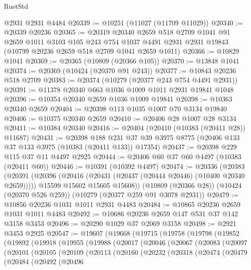 \begin{lexlean}{RustStd}
\begin{coremodule}
    @2931
    @2931
    @4484
@20339 := @10251 (@11027 (@11709 @11029))
@20340 := @20339 @20236
@20365 := @20319
    @20340
    @2659
    @518
    @2709
    @1041
    @91
    @2659
    @1011
    @3103
    @105
    @243
    @754
    @1037
    @4491
    @2931
    @2931
    @19843
    (@10799 @20236 @2659 @518 @2709 @1041 @2659 @1011)
@20366 := @10829 @1041
@20369 := @20365 (@10809 (@20366 @105))
@20370 := @13848 @1041
@20374 := @20369 (@10424 (@20370 @91 @243))
@20377 := @10843 @20236 @518 @2709
@20383 := @20374 (@10279 (@20377 @243 @754 @4491 @2931))
@20391 := @11378 @20340 @663 @1036 @1009 @1011 @2931 @19841 @1048
@20396 := @10354 @20340 @2659 @1036 @1009 @19841
@20398 := @10363 @20340 @2659
@20404 := @20398 @113 @1035 @1007 @70 @3134 @19840
@20406 := @10375 @20340 @2659
@20410 := @20406 @28 @1007 @28 @3134
@20411 := @10384 @20340
@20416 := @20404 (@20410 (@10383 (@20411 @28)) @11687)
@20431 := @20398
    @188
    @231
    @37
    @39
    @3975
    @8775
    (@20406 @133 @37 @133 @3975 (@10383 (@20411 @133)) @17354)
@20437 := @20398 @229 @115 @37 @11 @4497 @2925
@20444 := @20406 @60 @37 @60 @4497 (@10383 (@20411 @60))
@20446 := @10391 (@10392 @4497)
@20474 := @20336
    (@20383
      (@20391
        (@20396 (@20416 (@20431 (@20437 (@20444 @20446) (@10400 @20340 @2659)))))
        @15599
        @15602
        @15605
        @15608))
    (@10809 (@20366 @28))
    (@10424 (@20370 @526 @259))
    (@10279 (@20377 @259 @91 @3078 @2931))
@20479 := @10856 @20236 @1031 @1011 @2931 @4483
@20484 := @10865 @20236 @2659 @1031 @1011 @4483
@20492 := @10686 @20236 @2659 @147 @531 @37 @142 @3158 @3453
@20496 := @20290 @1029 @37 @2069 @3158
@20498 := @2921 @3453 @2925
@20547 := @19607
    (@19668
      (@19715
        (@19758
          (@19798
            (@19852
              (@19892
                (@19918
                  (@19955
                    (@19988
                      (@20017
                        (@20046
                          (@20067
                            (@20083
                              (@20097
                                (@20101
                                  (@20105
                                    (@20109
                                      (@20113
                                        (@20160
                                          (@20232
                                            (@20318
                                              (@20474
                                                (@20479
                                                  (@20484
                                                    (@20492
                                                      (@20496

\end{coremodule}
\end{lexlean}
